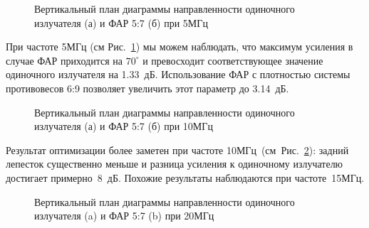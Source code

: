 \begin{figure}
\begin{minipage}[h]{0.49\linewidth}
\end{minipage}
\hfill
\begin{minipage}[h]{0.49\linewidth}
\end{minipage}
\caption{Вертикальный план диаграммы направленности одиночного излучателя (а) и ФАР 5:7 (б) при 5МГц}
\label{ris:5MHz}
\end{figure}

При частоте 5МГц (см Рис.~\ref{ris:5MHz}) мы можем наблюдать, что максимум усиления в случае ФАР приходится на $70^{\circ}$ и превосходит соответствующее значение одиночного излучателя на 1.33~дБ. Использование ФАР с плотностью системы противовесов 6:9 позволяет увеличить этот параметр до 3.14~дБ.

\begin{figure}
\begin{minipage}[h]{0.49\linewidth}
\end{minipage}
\hfill
\begin{minipage}[h]{0.49\linewidth}
\end{minipage}
\caption{Вертикальный план диаграммы направленности одиночного излучателя (а) и ФАР 5:7 (б) при 10МГц}
\label{ris:10MHz}
\end{figure}

Результат оптимизации более заметен при частоте 10МГц~(см~Рис.~\ref{ris:10MHz}): задний лепесток существенно меньше и разница усиления к одиночному излучателю достигает примерно~8~дБ. Похожие результаты наблюдаются при частоте~15МГц.

\begin{figure}
\begin{minipage}[h]{0.49\linewidth}
\end{minipage}
\hfill
\begin{minipage}[h]{0.49\linewidth}
\end{minipage}
\caption{Вертикальный план диаграммы направленности одиночного излучателя (a) и ФАР 5:7 (b) при 20МГц}
\label{ris:f20mhs}
\end{figure}

